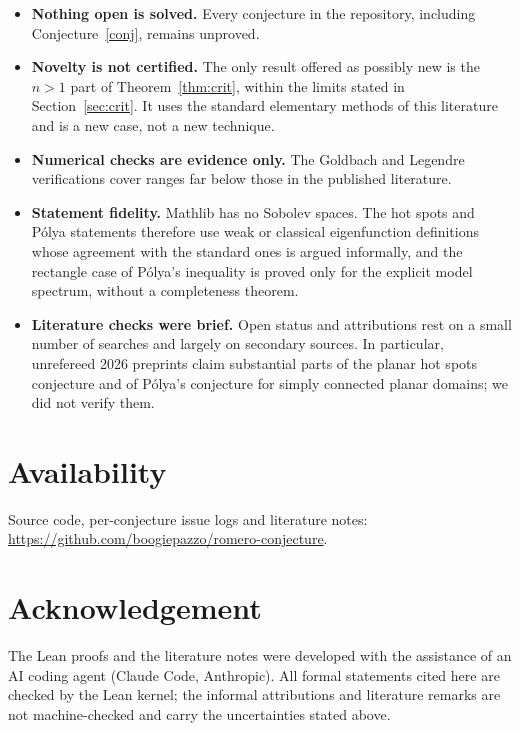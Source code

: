 \documentclass[11pt,a4paper]{article}
\theoremstyle{remark}
\begin{document}
\begin{itemize}
\item \textbf{Nothing open is solved.} Every conjecture in the repository,
including Conjecture~\ref{conj}, remains unproved.
\item \textbf{Novelty is not certified.} The only result offered as possibly
new is the $n>1$ part of Theorem~\ref{thm:crit}, within the limits stated in
Section~\ref{sec:crit}. It uses the standard elementary methods of this
literature and is a new case, not a new technique.
\item \textbf{Numerical checks are evidence only.} The Goldbach and Legendre
verifications cover ranges far below those in the published literature.
\item \textbf{Statement fidelity.} Mathlib has no Sobolev spaces. The hot spots
and P\'olya statements therefore use weak or classical eigenfunction
definitions whose agreement with the standard ones is argued informally, and
the rectangle case of P\'olya's inequality is proved only for the explicit
model spectrum, without a completeness theorem.
\item \textbf{Literature checks were brief.} Open status and attributions rest
on a small number of searches and largely on secondary sources. In particular,
unrefereed 2026 preprints claim substantial parts of the planar hot spots
conjecture and of P\'olya's conjecture for simply connected planar domains; we
did not verify them.
\end{itemize}

\section*{Availability}

Source code, per-conjecture issue logs and literature notes:
\url{https://github.com/boogiepazzo/romero-conjecture}.

\section*{Acknowledgement}

The Lean proofs and the literature notes were developed with the assistance of
an AI coding agent (Claude Code, Anthropic). All formal statements cited here
are checked by the Lean kernel; the informal attributions and literature
remarks are not machine-checked and carry the uncertainties stated above.
\end{document}
